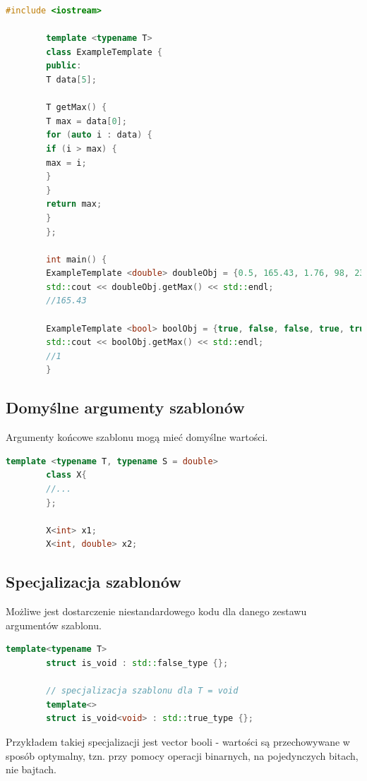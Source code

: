 \documentclass[12pt]{article}
\begin{document}
    \newpage
    \begin{lstlisting}[language=C++]
        #include <iostream>

        template <typename T>
        class ExampleTemplate {
        public:
        T data[5];

        T getMax() {
        T max = data[0];
        for (auto i : data) {
        if (i > max) {
        max = i;
        }
        }
        return max;
        }
        };

        int main() {
        ExampleTemplate <double> doubleObj = {0.5, 165.43, 1.76, 98, 23};
        std::cout << doubleObj.getMax() << std::endl;
        //165.43

        ExampleTemplate <bool> boolObj = {true, false, false, true, true};
        std::cout << boolObj.getMax() << std::endl;
        //1
        }
    \end{lstlisting}

    \subsection{Domyślne argumenty szablonów}

    Argumenty końcowe szablonu mogą mieć domyślne wartości.

    \begin{lstlisting}[language=C++]
        template <typename T, typename S = double>
        class X{
        //...
        };

        X<int> x1;
        X<int, double> x2;
    \end{lstlisting}

    \newpage
    \subsection{Specjalizacja szablonów}
    Możliwe jest dostarczenie niestandardowego kodu dla danego zestawu argumentów szablonu.

    \begin{lstlisting}[language=C++]
        template<typename T>
        struct is_void : std::false_type {};

        // specjalizacja szablonu dla T = void
        template<>
        struct is_void<void> : std::true_type {};
    \end{lstlisting}

    Przykładem takiej specjalizacji jest vector booli - wartości są przechowywane
    w sposób optymalny, tzn. przy pomocy operacji binarnych, na pojedynczych bitach,
    nie bajtach.
    \newpage
\end{document}
